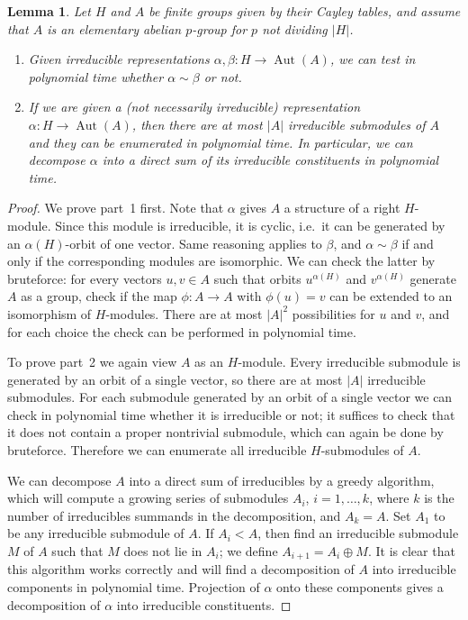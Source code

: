 \documentclass{article}
\newtheorem{lemma}[theorem]{Lemma}
\DeclareMathOperator{\Aut}{Aut}
\begin{document}
\begin{lemma}\label{ldecomp}
	Let \( H \) and \( A \) be finite groups given by their Cayley tables, and assume that \( A \)
	is an elementary abelian \( p \)-group for \( p \) not dividing \( |H| \).
	\begin{enumerate}
		\item Given irreducible representations \( \alpha, \beta : H \to \Aut(A) \), we can
			test in polynomial time whether \( \alpha \sim \beta \) or not.
		\item If we are given a (not necessarily irreducible) representation \( \alpha : H \to \Aut(A) \),
			then there are at most \( |A| \) irreducible submodules of \( A \) and they can be enumerated in polynomial time.
			In particular, we can decompose \( \alpha \) into a direct sum of its irreducible constituents in polynomial time.
	\end{enumerate}
\end{lemma}
\begin{proof}
	We prove part~1 first. Note that \( \alpha \) gives \( A \) a structure of a right \( H \)-module.
	Since this module is irreducible, it is cyclic, i.e.\ it can be generated by an \( \alpha(H) \)-orbit of one vector.
	Same reasoning applies to \( \beta \), and \( \alpha \sim \beta \) if and only if the corresponding modules are isomorphic.
	We can check the latter by bruteforce: for every vectors \( u, v \in A \) such that orbits \( u^{\alpha(H)} \) and \( v^{\alpha(H)} \) generate \( A \)
	as a group, check if the map \( \phi : A \to A \) with \( \phi(u) = v \) can be extended to an isomorphism of \( H \)-modules. There are at most \( |A|^2 \)
	possibilities for \( u \) and \( v \), and for each choice the check can be performed in polynomial time.

	To prove part~2 we again view \( A \) as an \( H \)-module. Every irreducible submodule is generated by an orbit of a single vector,
	so there are at most \( |A| \) irreducible submodules. For each submodule generated by an orbit of a single vector we can check in polynomial
	time whether it is irreducible or not; it suffices to check that it does not contain a proper nontrivial submodule, which can again be done by bruteforce.
	Therefore we can enumerate all irreducible \( H \)-submodules of \( A \).

	We can decompose \( A \) into a direct sum of irreducibles by a greedy algorithm, which will compute a growing series
	of submodules \( A_i \), \( i = 1, \dots, k \), where \( k \) is the number of irreducibles summands in the decomposition, and \( A_k = A \).
	Set \( A_1 \) to be any irreducible submodule of \( A \). If \( A_i < A \), then find an irreducible submodule \( M \) of \( A \)
	such that \( M \) does not lie in \( A_i \); we define \( A_{i+1} = A_i \oplus M \). It is clear that this algorithm works correctly
	and will find a decomposition of \( A \) into irreducible components in polynomial time. Projection of \( \alpha \) onto these components
	gives a decomposition of \( \alpha \) into irreducible constituents.
\end{proof}
\end{document}

